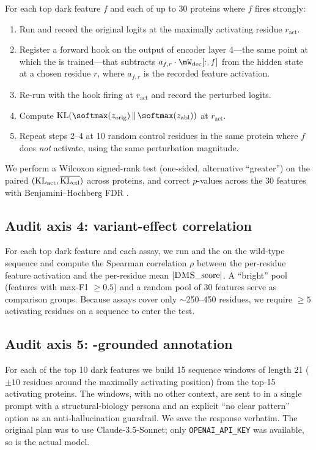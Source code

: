 For each top dark feature $f$ and each of up to 30 proteins where $f$ fires strongly:
\begin{enumerate}[leftmargin=*,itemsep=0pt,topsep=0pt]
    \item Run \esm and record the original \mlm logits at the maximally activating residue $r_{\text{act}}$.
    \item Register a forward hook on the output of encoder layer 4---the same point at which the \sae is trained---that subtracts $a_{f,r} \cdot \mW_{\text{dec}}[:, f]$ from the hidden state at a chosen residue $r$, where $a_{f,r}$ is the recorded feature activation.
    \item Re-run \esm with the hook firing at $r_{\text{act}}$ and record the perturbed logits.
    \item Compute $\KL(\softmax(z_{\text{orig}}) \,\Vert\, \softmax(z_{\text{abl}}))$ at $r_{\text{act}}$.
    \item Repeat steps 2--4 at 10 random control residues in the same protein where $f$ does \emph{not} activate, using the same perturbation magnitude.
\end{enumerate}
We perform a Wilcoxon signed-rank test (one-sided, alternative ``greater'') on the paired $(\mathrm{KL}_{\text{act}}, \overline{\mathrm{KL}_{\text{ctl}}})$ across proteins, and correct $p$-values across the 30 features with Benjamini--Hochberg FDR \citep{benjamini1995fdr}.

\subsection{Audit axis 4: \proteingym variant-effect correlation}
\label{ssec:gym}

For each top dark feature and each \dms assay, we run \esm and the \sae on the wild-type sequence and compute the Spearman correlation $\rho$ between the per-residue feature activation and the per-residue mean $|\textsc{DMS}\text{\_score}|$. A ``bright'' pool (features with max-F1 $\geq 0.5$) and a random pool of 30 features serve as comparison groups. Because \dms assays cover only $\sim$250--450 residues, we require $\geq 5$ activating residues on a sequence to enter the test.

\subsection{Audit axis 5: \gptfive-grounded annotation}
\label{ssec:llm}

For each of the top 10 dark features we build 15 sequence windows of length 21 ($\pm 10$ residues around the maximally activating position) from the top-15 activating proteins. The windows, with no other context, are sent to \gptfive in a single prompt with a structural-biology persona and an explicit ``no clear pattern'' option as an anti-hallucination guardrail. We save the response verbatim. The original plan was to use Claude-3.5-Sonnet; only \texttt{OPENAI\_API\_KEY} was available, so \gptfive is the actual model.

